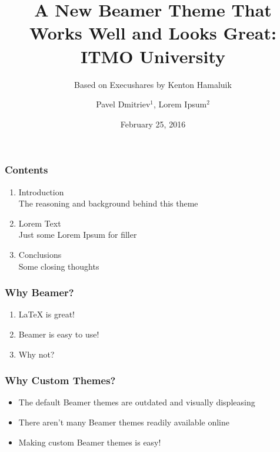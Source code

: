 \documentclass{beamer}
\title{A New Beamer Theme That Works Well and Looks Great: ITMO University}
\subtitle{Based on Execushares by Kenton Hamaluik}
\author{Pavel Dmitriev$^1$, Lorem Ipsum$^2$}
\institute{$^1$Metamaterials lab, ITMO University \\
	$^2$Dolor sit amet}
\date{February 25, 2016}
\begin{document}
	\setcounter{showProgressBar}{0}
	\setcounter{showSlideNumbers}{0}


	\begin{frame}
		\frametitle{Contents}
		\begin{enumerate}
			\item Introduction \\ \textcolor{StyleGrey}{\footnotesize\hspace{1em} The reasoning and background behind this theme}
			\item Lorem Text  \\ \textcolor{StyleGrey}{\footnotesize\hspace{1em} Just some Lorem Ipsum for filler}
			\item Conclusions \\ \textcolor{StyleGrey}{\footnotesize\hspace{1em} Some closing thoughts}
		\end{enumerate}
	\end{frame}
	
	\setcounter{framenumber}{0}
	\setcounter{showProgressBar}{1}
	\setcounter{showSlideNumbers}{1}
		\begin{frame}
			\frametitle{Why Beamer?}
			\begin{enumerate}
				\item LaTeX is great!
				\item Beamer is easy to use!
				\item Why not?
			\end{enumerate}
		\end{frame}

		\begin{frame}
			\frametitle{Why Custom Themes?}
			\begin{itemize}
				\item The default Beamer themes are outdated and visually displeasing
				\item There aren't many Beamer themes readily available online
				\item Making custom Beamer themes is easy!
			\end{itemize}
		\end{frame}
\end{document}
